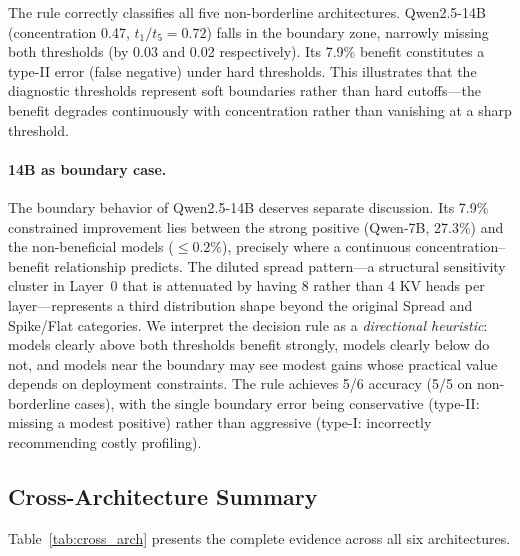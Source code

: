 \documentclass[11pt,a4paper]{article}
\newcommand{\tratio}{\ensuremath{t_1/t_5}}
\begin{document}
The rule correctly classifies all five non-borderline architectures.
Qwen2.5-14B (concentration 0.47, $\tratio = 0.72$) falls in the boundary zone, narrowly missing both thresholds (by 0.03 and 0.02 respectively).
Its 7.9\% benefit constitutes a type-II error (false negative) under hard thresholds.
This illustrates that the diagnostic thresholds represent soft boundaries rather than hard cutoffs---the benefit degrades continuously with concentration rather than vanishing at a sharp threshold.

\paragraph{14B as boundary case.}
The boundary behavior of Qwen2.5-14B deserves separate discussion.
Its 7.9\% constrained improvement lies between the strong positive (Qwen-7B, 27.3\%) and the non-beneficial models ($\le 0.2\%$), precisely where a continuous concentration--benefit relationship predicts.
The diluted spread pattern---a structural sensitivity cluster in Layer~0 that is attenuated by having 8 rather than 4 KV heads per layer---represents a third distribution shape beyond the original Spread and Spike/Flat categories.
We interpret the decision rule as a \emph{directional heuristic}: models clearly above both thresholds benefit strongly, models clearly below do not, and models near the boundary may see modest gains whose practical value depends on deployment constraints.
The rule achieves 5/6 accuracy (5/5 on non-borderline cases), with the single boundary error being conservative (type-II: missing a modest positive) rather than aggressive (type-I: incorrectly recommending costly profiling).

\subsection{Cross-Architecture Summary}
\label{sec:cross_arch}

Table~\ref{tab:cross_arch} presents the complete evidence across all six architectures.
\end{document}

